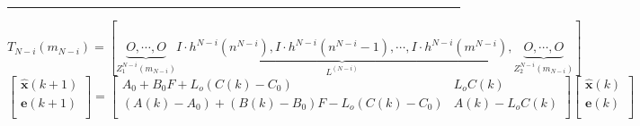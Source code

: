 \documentclass{aas}
\begin{document}
\vskip1mm
\hrule
\begin{equation}
T_{N-i}(m_{N-i})= \left[ \underbrace{O,\cdots,
O}_{Z_1^{N-i}(m_{N-i})} \underbrace{I \cdot h^{N-i}(n^{N-i}), I
\cdot h^{N-i}(n^{N-i}-1),\cdots, I \cdot
h^{N-i}(m^{N-i})}_{L^{(N-i)}},\underbrace{O,\cdots,
O}_{Z_2^{N-i}(m_{N-i})} \right]\tag{3}
\end{equation}
\begin{equation} \left[
  \begin{array}{c}
    \hat{{\pmb x}}(k+1) \\
    {\pmb e}(k+1)\\
  \end{array}
\right]=\left[
  \begin{array}{cc}
    A_0+B_0F+L_o(C(k)-C_0) & L_oC(k) \\
    (A(k)-A_0)+(B(k)-B_0)F-L_o(C(k)-C_0) & A(k)-L_oC(k) \\
  \end{array}
\right]\left[
  \begin{array}{c}
    \hat{{\pmb x}}(k) \\
    {\pmb e} (k)\\
  \end{array}
\right]\tag{4}
\end{equation}
\begin{multicols}{2}%

\end{multicols}%
\end{document}
